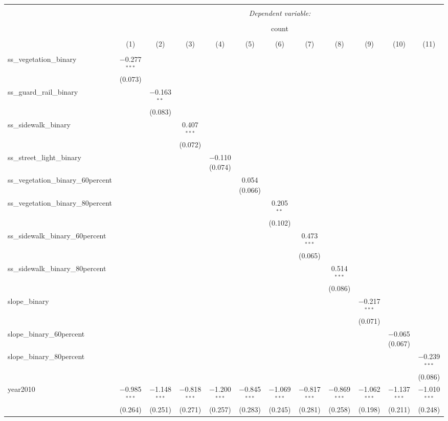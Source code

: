 
\begin{table}[!htbp] \centering 
  \caption{} 
  \label{} 
\small 
\begin{tabular}{@{\extracolsep{1pt}}lccccccccccc} 
\\[-1.8ex]\hline 
\hline \\[-1.8ex] 
 & \multicolumn{11}{c}{\textit{Dependent variable:}} \\ 
\cline{2-12} 
\\[-1.8ex] & \multicolumn{11}{c}{count} \\ 
\\[-1.8ex] & (1) & (2) & (3) & (4) & (5) & (6) & (7) & (8) & (9) & (10) & (11)\\ 
\hline \\[-1.8ex] 
 ss\_vegetation\_binary & $-$0.277$^{***}$ (0.073) &  &  &  &  &  &  &  &  &  &  \\ 
  ss\_guard\_rail\_binary &  & $-$0.163$^{**}$ (0.083) &  &  &  &  &  &  &  &  &  \\ 
  ss\_sidewalk\_binary &  &  & 0.407$^{***}$ (0.072) &  &  &  &  &  &  &  &  \\ 
  ss\_street\_light\_binary &  &  &  & $-$0.110 (0.074) &  &  &  &  &  &  &  \\ 
  ss\_vegetation\_binary\_60percent &  &  &  &  & 0.054 (0.066) &  &  &  &  &  &  \\ 
  ss\_vegetation\_binary\_80percent &  &  &  &  &  & 0.205$^{**}$ (0.102) &  &  &  &  &  \\ 
  ss\_sidewalk\_binary\_60percent &  &  &  &  &  &  & 0.473$^{***}$ (0.065) &  &  &  &  \\ 
  ss\_sidewalk\_binary\_80percent &  &  &  &  &  &  &  & 0.514$^{***}$ (0.086) &  &  &  \\ 
  slope\_binary &  &  &  &  &  &  &  &  & $-$0.217$^{***}$ (0.071) &  &  \\ 
  slope\_binary\_60percent &  &  &  &  &  &  &  &  &  & $-$0.065 (0.067) &  \\ 
  slope\_binary\_80percent &  &  &  &  &  &  &  &  &  &  & $-$0.239$^{***}$ (0.086) \\ 
  year2010 & $-$0.985$^{***}$ (0.264) & $-$1.148$^{***}$ (0.251) & $-$0.818$^{***}$ (0.271) & $-$1.200$^{***}$ (0.257) & $-$0.845$^{***}$ (0.283) & $-$1.069$^{***}$ (0.245) & $-$0.817$^{***}$ (0.281) & $-$0.869$^{***}$ (0.258) & $-$1.062$^{***}$ (0.198) & $-$1.137$^{***}$ (0.211) & $-$1.010$^{***}$ (0.248) \\ 

\end{tabular}
\end{table}
